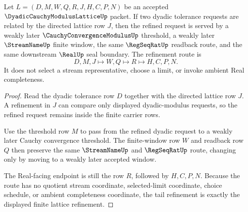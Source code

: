 \begin{theorem}
\label{thm:dyadic-cauchy-modulus-lattice-tail-refinement}
Let $L=(D,M,W,Q,R,J,H,C,P,N)$ be an accepted $\DyadicCauchyModulusLatticeUp$ packet. If two dyadic tolerance requests are related by the directed lattice row $J$, then the refined request is served by a weakly later $\CauchyConvergenceModulusUp$ threshold, a weakly later $\StreamNameUp$ finite window, the same $\RegSeqRatUp$ readback route, and the same downstream $\RealUp$ seal boundary. The refinement route is
$$
D,M,J \longmapsto W,Q \longmapsto R \longmapsto H,C,P,N .
$$
It does not select a stream representative, choose a limit, or invoke ambient Real completeness.
\end{theorem}
\begin{proof}
Read the dyadic tolerance row $D$ together with the directed lattice row $J$. A refinement in $J$ can compare only displayed dyadic-modulus requests, so the refined request remains inside the finite carrier rows.

Use the threshold row $M$ to pass from the refined dyadic request to a weakly later Cauchy convergence threshold. The finite-window row $W$ and readback row $Q$ then preserve the same $\StreamNameUp$ and $\RegSeqRatUp$ route, changing only by moving to a weakly later accepted window.

The Real-facing endpoint is still the row $R$, followed by $H,C,P,N$. Because the route has no quotient stream coordinate, selected-limit coordinate, choice schedule, or ambient completeness coordinate, the tail refinement is exactly the displayed finite lattice refinement.
\end{proof}

